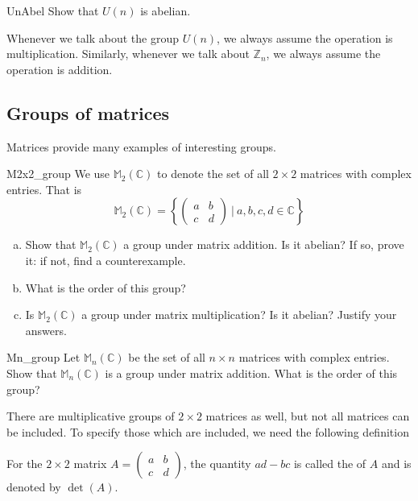 \begin{exercise}{UnAbel}
Show that $U(n)$ is abelian.
\end{exercise}

\begin{rem}\label{UnMul}
Whenever we talk about the group $U(n)$, we always assume the operation is multiplication. Similarly, whenever we talk about ${\mathbb Z}_n$, we always assume the operation is addition.
\end{rem}

\subsection{Groups of matrices}
Matrices provide many examples of interesting groups.

\begin{exercise}{M2x2_group}
We use  ${\mathbb M}_2 ( {\mathbb C})$\label{notematrices} to denote the set of all $2 \times 2$ matrices with complex entries.  That is
\[
{\mathbb M}_2 ( {\mathbb C}) = \left\{ 
\begin{pmatrix}
a & b \\
c & d
\end{pmatrix} ~|~ a,b,c,d \in {\mathbb C} \right\} \]

\begin{enumerate}[(a)]
\item
Show that ${\mathbb M}_2 ( {\mathbb C})$ a group under matrix addition. Is it abelian? If so, prove it: if not, find a counterexample.
\item
What is the order of this group?
\item
Is ${\mathbb M}_2 ( {\mathbb C})$ a group under matrix multiplication? Is it abelian? Justify your answers.
\end{enumerate}
\end{exercise} 

\begin{exercise}{Mn_group}
Let  ${\mathbb M}_n ( {\mathbb C})$ \label{notematrices} be the set of all $n\times n$ matrices with complex entries.  Show that  ${\mathbb M}_n ( {\mathbb C})$ is a group under matrix addition. What is the order of this group?
\end{exercise}

There are multiplicative groups of $2 \times 2$ matrices as well, but not all matrices can be included. To specify those which are included, we need the following definition

\begin{defn}  
For the $2\times 2$ matrix  $A =
\begin{pmatrix}
a & b \\
c & d
\end{pmatrix}$, the quantity $ad-bc$ is called the  of $A$ and is denoted by $\det(A)$.
\end{defn}

